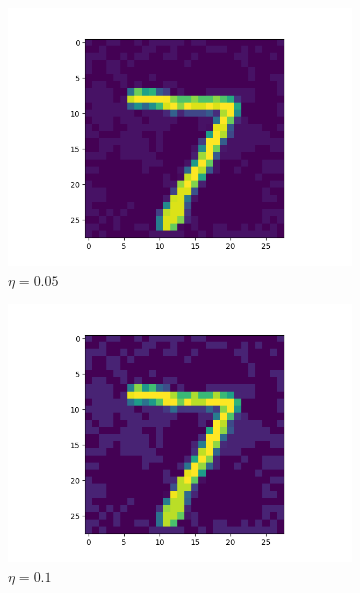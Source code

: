 \begin{figure}
  \centering
  \begin{subfigure}{0.3\linewidth}
    \includegraphics[width=\linewidth]{Images/adversarial-input-fc-100-100-10-005.png}
    \caption{$\eta = 0.05$}
  \end{subfigure}
  \begin{subfigure}{0.3\linewidth}
    \includegraphics[width=\linewidth]{Images/adversarial-input-fc-100-100-10-01.png}
    \caption{$\eta = 0.1$}
  \end{subfigure}
  \begin{subfigure}{0.3\linewidth}

\end{subfigure}
\end{figure}
